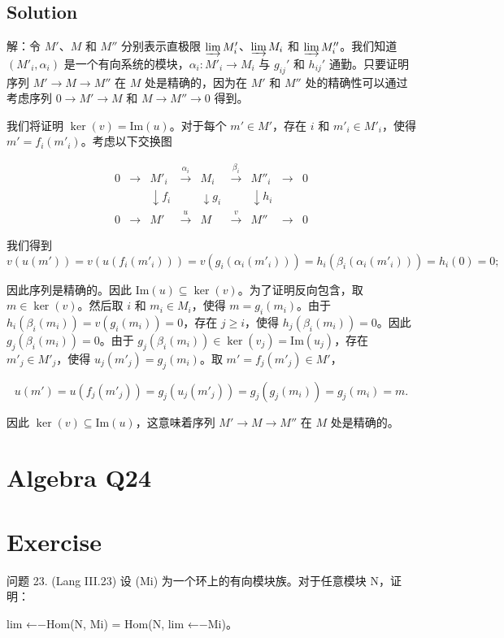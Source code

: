 \documentclass[12pt]{book}
\begin{document}
\subsection*{Solution}
解：令 $M'$、$M$ 和 $M''$ 分别表示直极限 $\varinjlim M'_i$、$\varinjlim M_i$ 和 $\varinjlim M''_i$。我们知道 $(M'_i, \alpha_i)$ 是一个有向系统的模块，$\alpha_i : M'_i \to M_i$ 与 $g_{ij}'$ 和 $h_{ij}'$ 通勤。只要证明序列 $M' \to M \to M''$ 在 $M$ 处是精确的，因为在 $M'$ 和 $M''$ 处的精确性可以通过考虑序列 $0 \to M' \to M$ 和 $M \to M'' \to 0$ 得到。

我们将证明 $\ker(v) = \text{Im}(u)$。对于每个 $m' \in M'$，存在 $i$ 和 $m'_i \in M'_i$，使得 $m' = f_i(m'_i)$。考虑以下交换图

\[\begin{array}{ccccccccc}
0 & \to & M'_i & \xrightarrow{\alpha_i} & M_i & \xrightarrow{\beta_i} & M''_i & \to & 0 \\
& & \downarrow f_i & & \downarrow g_i & & \downarrow h_i & & \\
0 & \to & M' & \xrightarrow{u} & M & \xrightarrow{v} & M'' & \to & 0
\end{array}\]

我们得到
\[v(u(m')) = v(u(f_i(m'_i))) = v(g_i(\alpha_i(m'_i))) = h_i(\beta_i(\alpha_i(m'_i))) = h_i(0) = 0;\]

因此序列是精确的。因此 $\text{Im}(u) \subseteq \ker(v)$。为了证明反向包含，取 $m \in \ker(v)$。然后取 $i$ 和 $m_i \in M_i$，使得 $m = g_i(m_i)$。由于 $h_i(\beta_i(m_i)) = v(g_i(m_i)) = 0$，存在 $j \ge i$，使得 $h_j(\beta_i(m_i)) = 0$。因此 $g_j(\beta_i(m_i)) = 0$。由于 $g_j(\beta_i(m_i)) \in \ker(v_j) = \text{Im}(u_j)$，存在 $m'_j \in M'_j$，使得 $u_j(m'_j) = g_j(m_i)$。取 $m' = f_j(m'_j) \in M'$，

\[u(m') = u(f_j(m'_j)) = g_j(u_j(m'_j)) = g_j(g_j(m_i)) = g_j(m_i) = m.\]

因此 $\ker(v) \subseteq \text{Im}(u)$，这意味着序列 $M' \to M \to M''$ 在 $M$ 处是精确的。
\newpage
\section{Algebra Q24}
\section*{Exercise}
问题 23. (Lang III.23) 设 (Mi) 为一个环上的有向模块族。对于任意模块 N，证明：

lim
←−Hom(N, Mi) = Hom(N, lim
←−Mi)。
\end{document}
